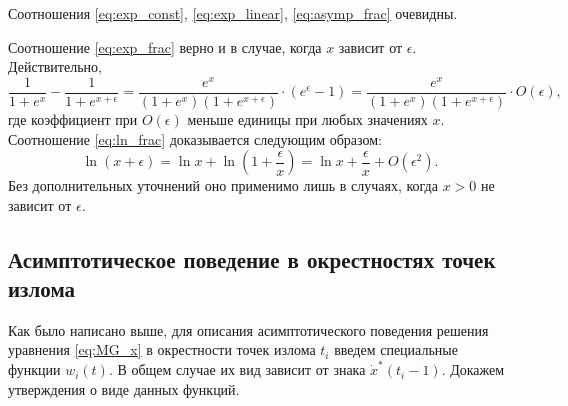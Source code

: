Соотношения \eqref{eq:exp_const}, \eqref{eq:exp_linear}, \eqref{eq:asymp_frac} очевидны.

Соотношение \eqref{eq:exp_frac} верно и в случае, когда $x$ зависит от $\epsilon$. Действительно,
%
\[
\dfrac{1}{1 + e^x} - \dfrac{1}{1 + e^{x + \epsilon}} = \dfrac{e^x}{(1 + e^x)(1 + e^{x + \epsilon})} \cdot (e^{\epsilon} - 1) = \dfrac{e^x}{(1 + e^x)(1 + e^{x + \epsilon})} \cdot O(\epsilon),
\]
где коэффициент при $O(\epsilon)$ меньше единицы при любых значениях $x$.
%
Соотношение \eqref{eq:ln_frac} доказывается следующим образом:
\[
\ln(x + \epsilon) = \ln x + \ln\left(1 + \frac{\epsilon}{x}\right) = \ln x + \frac{\epsilon}{x} + O(\epsilon^2).
\]
Без дополнительных уточнений оно применимо лишь в случаях, когда $x > 0$ не зависит от $\epsilon$.

\subsection{Асимптотическое поведение в окрестностях точек излома}
\label{subsect:ch1:w_func}

Как было написано выше, для описания асимптотического поведения решения уравнения \eqref{eq:MG_x} в окрестности точек излома $t_i$ введем специальные функции $w_i(t)$. В общем случае их вид зависит от знака $\dot{x}^*(t_i - 1)$. Докажем утверждения о виде данных функций.

